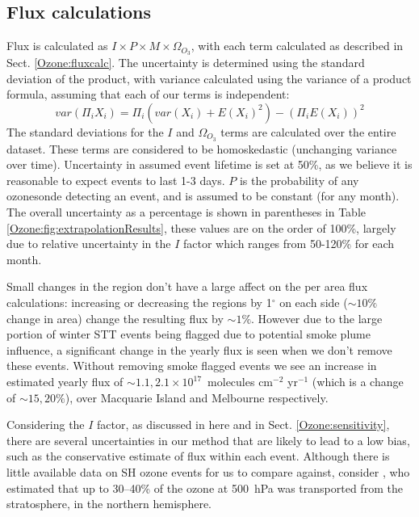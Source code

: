   \subsection{Flux calculations}
    \label{Ozone:fluxuncertainty}
    Flux is calculated as $ I \times P \times M \times \Omega_{O_3}$, with each term calculated as described in Sect. \ref{Ozone:fluxcalc}.
    The uncertainty is determined using the standard deviation of the product, with variance calculated using the variance of a product formula, assuming that each of our terms is independent: 
    \begin{equation*} var(\Pi_i X_i) = \Pi_i ( var(X_i) + E(X_i)^2 ) - (\Pi_i E(X_i))^2 \end{equation*}
    The standard deviations for the $I$ and $\Omega_{O_3}$ terms are calculated over the entire dataset.
    These terms are considered to be homoskedastic (unchanging variance over time).
    Uncertainty in assumed event lifetime is set at 50\%, as we believe it is reasonable to expect events to last 1-3 days.
    $P$ is the probability of any ozonesonde detecting an event, and is assumed to be constant (for any month).
    The overall uncertainty as a percentage is shown in parentheses in Table \ref{Ozone:fig:extrapolationResults}, these values are on the order of 100\%, largely due to relative uncertainty in the $I$ factor which ranges from 50-120\% for each month.
    
    Small changes in the region don't have a large affect on the per area flux calculations: increasing or decreasing the regions by 1$^{\circ}$ on each side ($\sim 10\%$ change in area) change the resulting flux by $\sim 1\%$. %
    However due to the large portion of winter STT events being flagged due to potential smoke plume influence, a significant change in the yearly flux is seen when we don't remove these events.
    Without removing smoke flagged events we see an increase in estimated yearly flux of $\sim 1.1, 2.1 \times 10^{17} $~molecules cm$^{-2}$ yr$^{-1}$ (which is a change of $\sim 15, 20\%$), over Macquarie Island and Melbourne respectively.
    
    Considering the $I$ factor, as discussed in here and in Sect. \ref{Ozone:sensitivity}, there are several uncertainties in our method that are likely to lead to a low bias, such as the conservative estimate of flux within each event.
    Although there is little available data on SH ozone events for us to compare against, consider \textcite{Terao2008}, who estimated that up to 30--40\% of the ozone at 500~hPa was transported from the stratosphere, in the northern hemisphere.
    
